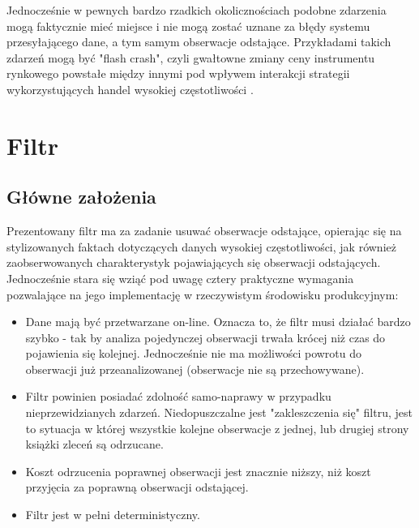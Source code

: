 \documentclass[a4paper,12pt,openany, DIV=calc, headsepline]{scrbook}
\begin{document}
Jednocześnie w pewnych bardzo rzadkich okolicznościach podobne zdarzenia mogą faktycznie mieć miejsce i nie mogą zostać uznane za błędy systemu przesyłającego dane, a tym samym obserwacje odstające. Przykładami takich zdarzeń mogą być "flash crash", czyli gwałtowne zmiany ceny instrumentu rynkowego powstałe między innymi pod wpływem interakcji strategii wykorzystujących handel wysokiej częstotliwości \citep{Easley2010}.

\chapter{Filtr}

\newcommand{\Spt}{\ensuremath{Sp_{t}} }

\newcommand{\MSpc}{\ensuremath{Sp_{t|t-1}} }
\newcommand{\MSpn}{\ensuremath{Sp_{t+1|t}} }
\newcommand{\MSpo}{\ensuremath{Sp_{t-1|t-1}} }

\newcommand{\ts}{\ensuremath{{t}} }
\newcommand{\tsl}{\ensuremath{{t-1}} }



\section{Główne założenia}

Prezentowany filtr ma za zadanie usuwać obserwacje odstające, opierając się na stylizowanych faktach dotyczących danych wysokiej częstotliwości, jak również zaobserwowanych charakterystyk pojawiających się obserwacji odstających. Jednocześnie stara się wziąć pod uwagę cztery praktyczne wymagania pozwalające na jego implementację w rzeczywistym środowisku produkcyjnym:


\begin{itemize}
\item Dane mają być przetwarzane on-line. Oznacza to, że filtr musi działać bardzo szybko - tak by analiza pojedynczej obserwacji trwała krócej niż czas do pojawienia się kolejnej. Jednocześnie nie ma możliwości powrotu do obserwacji już przeanalizowanej (obserwacje nie są przechowywane).
\item Filtr powinien posiadać zdolność samo-naprawy w przypadku nieprzewidzianych zdarzeń. Niedopuszczalne jest "zakleszczenia się" filtru, jest to sytuacja w której wszystkie kolejne obserwacje z jednej, lub drugiej strony książki zleceń są odrzucane.
\item Koszt odrzucenia poprawnej obserwacji jest znacznie niższy, niż koszt przyjęcia za poprawną obserwacji odstającej. 
\item Filtr jest w pełni deterministyczny.
\end{itemize} 
\end{document}
